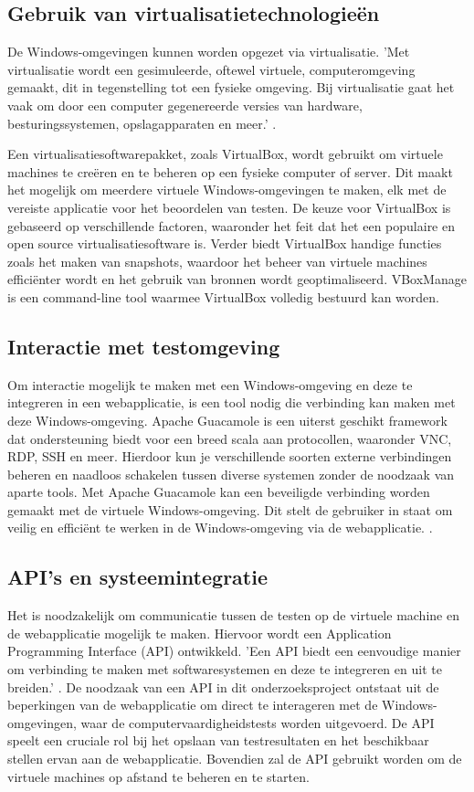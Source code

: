 \subsection{Gebruik van virtualisatietechnologieën}
De Windows-omgevingen kunnen worden opgezet via virtualisatie. 'Met virtualisatie wordt een gesimuleerde, oftewel virtuele, computeromgeving gemaakt, dit in tegenstelling tot een fysieke omgeving. Bij virtualisatie gaat het vaak om door een computer gegenereerde versies van hardware, besturingssystemen, opslagapparaten en meer.' \autocite{MicrosoftVirtualisationDefinition}.

Een virtualisatiesoftwarepakket, zoals VirtualBox, wordt gebruikt om virtuele machines te creëren en te beheren op een fysieke computer of server. Dit maakt het mogelijk om meerdere virtuele Windows-omgevingen te maken, elk met de vereiste applicatie voor het beoordelen van testen. De keuze voor VirtualBox is gebaseerd op verschillende factoren, waaronder het feit dat het een populaire en open source virtualisatiesoftware is. Verder biedt VirtualBox handige functies zoals het maken van snapshots, waardoor het beheer van virtuele machines efficiënter wordt en het gebruik van bronnen wordt geoptimaliseerd. VBoxManage is een command-line tool waarmee VirtualBox volledig bestuurd kan worden.

\subsection{Interactie met testomgeving}
Om interactie mogelijk te maken met een Wi\-ndows-omgeving en deze te integreren in een webapplicatie, is een tool nodig die verbinding kan maken met deze Windows-omgeving. Apache Guacamole is een uiterst geschikt framework dat ondersteuning biedt voor een breed scala aan protocollen, waaronder VNC, RDP, SSH en meer. Hierdoor kun je verschillende soorten externe verbindingen beheren en naadloos schakelen tussen diverse systemen zonder de noodzaak van aparte tools.
Met Apache Guacamole kan een beveiligde verbinding worden gemaakt met de virtuele Windows-omgeving. Dit stelt de gebruiker in staat om veilig en efficiënt te werken in de Windows-omgeving via de webapplicatie. \autocite{ApacheGuacamole}.

\subsection{API's en systeemintegratie}
Het is noodzakelijk om communicatie tussen de testen op de virtuele machine en de webapplicatie mogelijk te maken. Hiervoor wordt een Application Programming Interface (API) ontwikkeld. 'Een API biedt een eenvoudige manier om verbinding te maken met softwaresystemen en deze te integreren en uit te breiden.' \autocite{biehl2015api}. De noodzaak van een API in dit onderzoeksproject ontstaat uit de beperkingen van de webapplicatie om direct te interageren met de Windows-omgevingen, waar de computervaardigheidstests worden uitgevoerd. De API speelt een cruciale rol bij het opslaan van testresultaten en het beschikbaar stellen ervan aan de webapplicatie. Bovendien zal de API gebruikt worden om de virtuele machines op afstand te beheren en te starten.


